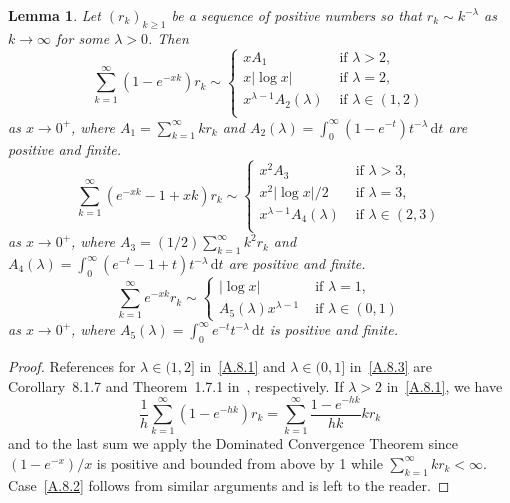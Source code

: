 \documentclass[11pt]{article}
\newtheorem{lemm}[theo]{Lemma}
\theoremstyle{definition}
\numberwithin{equation}{section}
\numberwithin{figure}{section}
\numberwithin{table}{section}
\newcommand{\gl}{\lambda}
\newcommand{\dd}{\mathrm{d}}
\begin{document}
\pagebreak
\begin{lemm}\label{seriesAsymptotics}
Let $(r_k)_{k\ge1}$ be a sequence of positive numbers so that $r_k\sim k^{-\gl}$ as $k\to\infty$ for some $\gl>0$. Then
\begin{equation} \tag{i} \label{A.8.1}
\sum_{k=1}^\infty (1-e^{-xk})r _k\sim
\begin{cases} x A_1& \text{ if } \gl>2, \\
x |{\log x}| & \text{ if } \gl=2, \\
x^{\gl-1}A_2(\gl) & \text{ if } \gl\in(1, 2) \\
\end{cases}
\end{equation}
as $x\to 0^+$, where $A_1=\sum_{k=1}^\infty k r_k$ and $A_2(\gl)=\int_0^\infty (1-e^{-t}) t^{-\gl}\, \dd t$ are positive and finite.
\begin{equation} \tag{ii} \label{A.8.2}
\sum_{k=1}^\infty (e^{-xk}-1+xk) r_k\sim
\begin{cases} x^2 A_3& \text{ if } \gl>3, \\
x^2|{\log x}|/2 & \text{ if } \gl=3, \\
x^{\gl-1}A_4(\gl) & \text{ if } \gl\in(2, 3) \\
\end{cases}
\end{equation}
as $x\to 0^+$, where $A_3=(1/2)\sum_{k=1}^\infty k^2 r_k$ and $A_4(\gl)=\int_0^\infty (e^{-t}-1+t) t^{-\gl}\, \dd t$ are positive and finite.
\begin{equation} \tag{iii} \label{A.8.3}
\sum_{k=1}^\infty e^{-xk} r_k \sim
\begin{cases}
|{\log x}| & \text{ if } \gl = 1,\\[2pt] A_5(\gl) x^{\gl-1}& \text{ if } \gl \in (0,1)
\end{cases}
\end{equation}
as $x\to 0^+$, where $A_5(\gl)=\int_0^\infty e^{-t}t^{-\gl}\, \dd t$ is positive and finite.
\end{lemm}

\begin{proof}
References for $\gl\in (1,2]$ in~\eqref{A.8.1} and $\gl\in(0,1]$ in~\eqref{A.8.3} are Corollary~8.1.7 and Theorem~1.7.1 in~\cite{BGT89}, respectively. If $\gl>2$ in~\eqref{A.8.1}, we have
\[
\frac{1}{h}\sum_{k=1}^\infty (1-e^{-hk}) r_k=\sum_{k=1}^\infty \frac{1-e^{-hk}}{hk} k r_k
\]
and to the last sum we apply the Dominated Convergence Theorem since $(1-e^{-x})/x$ is positive and bounded from above by 1 while $\sum_{k=1}^\infty k r_k<\infty$. Case~\eqref{A.8.2} follows from similar arguments and is left to the reader.
\end{proof}
\end{document}
